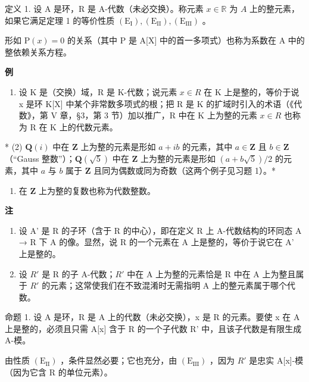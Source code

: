 定义 1. 设 A 是环，R 是 A-代数（未必交换）。称元素 \(x \in \mathbb{R}\) 为 \(A\) 上的整元素，如果它满足定理 1 的等价性质 \((\mathrm{E}_{\mathrm{I}}), (\mathrm{E}_{\mathrm{II}}), (\mathrm{E}_{\mathrm{III}})\) 。

形如 \(\mathrm{P}(x)=0\) 的关系（其中 P 是 A{[}X{]} 中的首一多项式）也称为系数在 A 中的整依赖关系方程。

\textbf{例}\par

\begin{enumerate}
\def\labelenumi{(\arabic{enumi})}
\tightlist
\item
  设 K 是（交换）域，R 是 K-代数；说元素 \(x \in R\) 在 K 上是整的，等价于说 x 是环 K{[}X{]} 中某个非常数多项式的根；把 R 是 K 的扩域时引入的术语（《代数》，第 V 章，§3，第 3 节）加以推广，R 中在 K 上为整的元素 \(x \in R\) 也称为 R 在 K 上的代数元素。
\end{enumerate}

* (2) \(\mathbf{Q}(i)\) 中在 \(\mathbf{Z}\) 上为整的元素是形如 \(a + ib\) 的元素，其中 \(a \in \mathbf{Z}\) 且 \(b \in \mathbf{Z}\) （``Gauss 整数''）；\(\mathbf{Q}(\sqrt{5})\) 中在 \(\mathbf{Z}\) 上为整的元素是形如 \((a + b\sqrt{5})/2\) 的元素，其中 \(a\) 与 \(b\) 属于 \(\mathbf{Z}\) 且同为偶数或同为奇数（这两个例子见习题 1）。*

\begin{enumerate}
\def\labelenumi{(\arabic{enumi})}
\setcounter{enumi}{2}
\tightlist
\item
  在 \(\mathbf{Z}\) 上为整的复数也称为代数整数。
\end{enumerate}

\textbf{注}\par

\begin{enumerate}
\def\labelenumi{(\arabic{enumi})}
\item
  设 A' 是 R 的子环（含于 R 的中心），即在定义 R 上 A-代数结构的环同态 A → R 下 A 的像。显然，说 R 的一个元素在 A 上是整的，等价于说它在 A' 上是整的。
\item
  设 \(R'\) 是 R 的子 A-代数；\(R'\) 中在 A 上为整的元素恰是 R 中在 A 上为整且属于 \(R'\) 的元素；这常使我们在不致混淆时无需指明 A 上的整元素属于哪个代数。
\end{enumerate}

命题 1. 设 A 是环，R 是 A 上的代数（未必交换），x 是 R 的元素。要使 x 在 A 上是整的，必须且只需 A{[}x{]} 含于 R 的一个子代数 R' 中，且该子代数是有限生成 A-模。

由性质 \((\mathrm{E}_{\mathrm{II}})\) ，条件显然必要；它也充分，由 \((\mathrm{E}_{\mathrm{III}})\) ，因为 \(R'\) 是忠实 A{[}x{]}-模（因为它含 R 的单位元素）。

